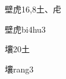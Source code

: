 \begin{Entry}{壁虎}{16,8}{⼟、⾌}
  \begin{Phonetics}{壁虎}{bi4hu3}
  \end{Phonetics}
\end{Entry}

\begin{Entry}{壤}{20}{⼟}
  \begin{Phonetics}{壤}{rang3}
  \end{Phonetics}
\end{Entry}


